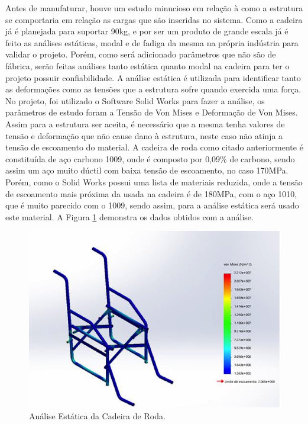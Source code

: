Antes de manufaturar, houve um estudo minucioso em relação à como a estrutura
se comportaria em relação as cargas que são inseridas no sistema. Como a
cadeira já é planejada para suportar 90kg, e por ser um produto de grande
escala já é feito as análises estáticas, modal e de fadiga da mesma na própria
indústria para validar o projeto. Porém, como será adicionado parâmetros que
não são de fábrica, serão feitas análises tanto estática quanto modal na
cadeira para ter o projeto possuir confiabilidade. A análise estática é
utilizada para identificar tanto as deformações como as tensões que a estrutura
sofre quando exercida uma força. No projeto, foi utilizado o Software Solid
Works para fazer a análise, os parâmetros de estudo foram a Tensão de Von Mises
e Deformação de Von Mises. Assim para a estrutura ser aceita, é necessário que
a mesma tenha valores de tensão e deformação que não cause dano à estrutura,
neste caso não atinja a tensão de escoamento do material. A cadeira de roda
como citado anteriormente é constituída de aço carbono 1009, onde é composto
por 0,09\% de carbono, sendo assim um aço muito dúctil com baixa tensão de
escoamento, no caso 170MPa. Porém, como o Solid Works possui uma lista de
materiais reduzida, onde a tensão de escoamento mais próxima da usada na
cadeira é de 180MPa, com o aço 1010, que é muito parecido com o 1009, sendo
assim, para a análise estática será usado este material.
A Figura \ref{fig:static_analisys} demonstra os dados obtidos com a análise.

\begin{figure}[!htb]
    \begin{center}
        \includegraphics{figuras/static_analisys.png}
    \end{center}
    \caption{Análise Estática da Cadeira de Roda.}
    \label{fig:static_analisys}
\end{figure}

